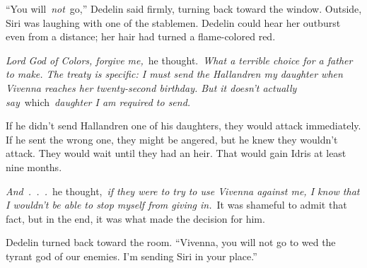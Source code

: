 “You will~\textit{not}~go,” Dedelin said firmly, turning back toward the window. Outside, Siri was laughing with one of the stablemen. Dedelin could hear her outburst even from a distance; her hair had turned a flame-colored red.

\textit{Lord God of Colors, forgive me,}~he thought.~\textit{What a terrible choice for a father to make. The treaty is specific: I must send the Hallandren my daughter when Vivenna reaches her twenty-second birthday. But it doesn’t actually say}~which~\textit{daughter I am required to send.}

If he didn’t send Hallandren one of his daughters, they would attack immediately. If he sent the wrong one, they might be angered, but he knew they wouldn’t attack. They would wait until they had an heir. That would gain Idris at least nine months.

\textit{And~.~.~.}~he thought,~\textit{if they were to try to use Vivenna against me, I know that I wouldn’t be able to stop myself from giving in.}~It was shameful to admit that fact, but in the end, it was what made the decision for him.

Dedelin turned back toward the room. “Vivenna, you will not go to wed the tyrant god of our enemies. I’m sending Siri in your place.”

